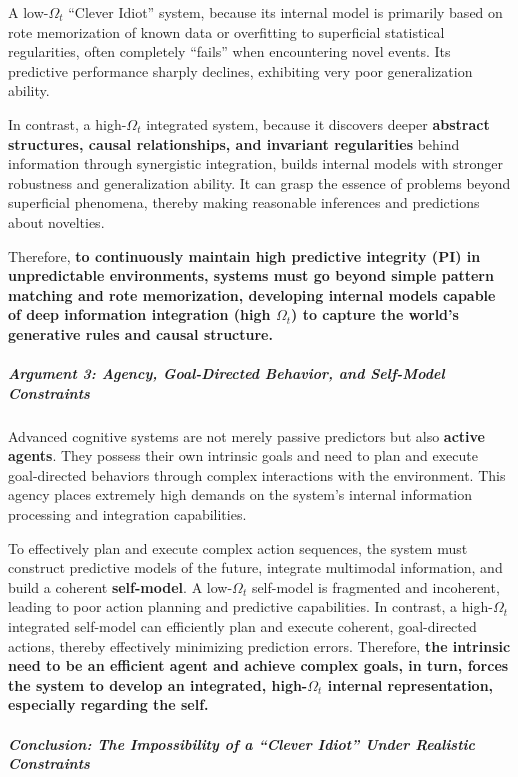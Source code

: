 \documentclass[
  a4paper]{article}
\begin{document}
A low-\(\Omega_t\) ``Clever Idiot'' system, because its internal model
is primarily based on rote memorization of known data or overfitting to
superficial statistical regularities, often completely ``fails'' when
encountering novel events. Its predictive performance sharply declines,
exhibiting very poor generalization ability.

In contrast, a high-\(\Omega_t\) integrated system, because it discovers
deeper \textbf{abstract structures, causal relationships, and invariant
regularities} behind information through synergistic integration, builds
internal models with stronger robustness and generalization ability. It
can grasp the essence of problems beyond superficial phenomena, thereby
making reasonable inferences and predictions about novelties.

Therefore, \textbf{to continuously maintain high predictive integrity
(PI) in unpredictable environments, systems must go beyond simple
pattern matching and rote memorization, developing internal models
capable of deep information integration (high \(\Omega_t\)) to capture
the world's generative rules and causal structure.}

\subparagraph{Argument 3: Agency, Goal-Directed Behavior, and Self-Model
Constraints}\label{argument-3-agency-goal-directed-behavior-and-self-model-constraints}

Advanced cognitive systems are not merely passive predictors but also
\textbf{active agents}. They possess their own intrinsic goals and need
to plan and execute goal-directed behaviors through complex interactions
with the environment. This agency places extremely high demands on the
system's internal information processing and integration capabilities.

To effectively plan and execute complex action sequences, the system
must construct predictive models of the future, integrate multimodal
information, and build a coherent \textbf{self-model}. A
low-\(\Omega_t\) self-model is fragmented and incoherent, leading to
poor action planning and predictive capabilities. In contrast, a
high-\(\Omega_t\) integrated self-model can efficiently plan and execute
coherent, goal-directed actions, thereby effectively minimizing
prediction errors. Therefore, \textbf{the intrinsic need to be an
efficient agent and achieve complex goals, in turn, forces the system to
develop an integrated, high-\(\Omega_t\) internal representation,
especially regarding the self.}

\subparagraph{Conclusion: The Impossibility of a ``Clever Idiot'' Under
Realistic
Constraints}\label{conclusion-the-impossibility-of-a-clever-idiot-under-realistic-constraints}
\end{document}
